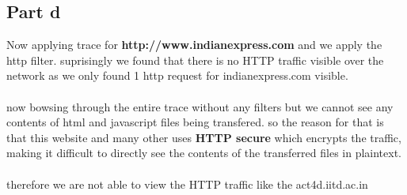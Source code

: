 \documentclass[11pt]{scrartcl}
\begin{document}
\subsection{Part d}
Now applying trace for \textbf{http://www.indianexpress.com} and we apply the http filter. suprisingly we found that there is no HTTP traffic visible over the network as we only found 1 http request for indianexpress.com visible. \\ \\
now bowsing through the entire trace without any filters but we cannot see any contents of html and javascript files being transfered. so the reason for that is that this website and many other uses \textbf{HTTP secure}  which encrypts the traffic, making it difficult to directly see the contents of the transferred files in plaintext. \\ \\
therefore we are not able to view the HTTP traffic like the act4d.iitd.ac.in 
\newpage

\newpage
\end{document}
